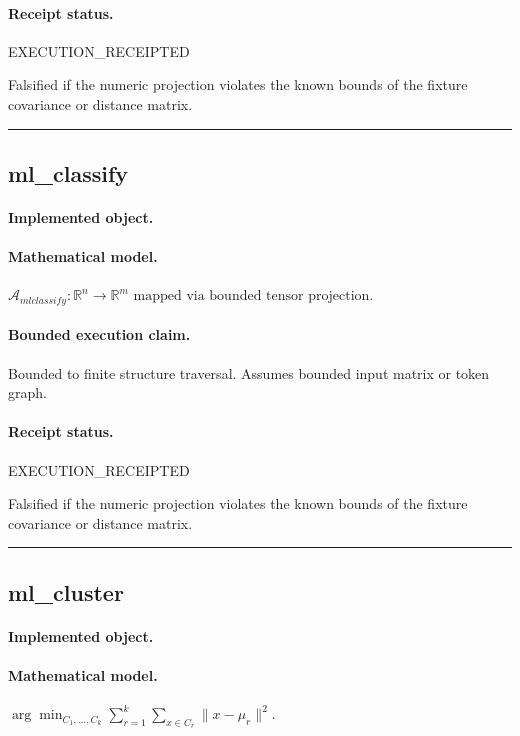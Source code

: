 \paragraph{Receipt status.} EXECUTION\_RECEIPTED
\begin{falsifier}
Falsified if the numeric projection violates the known bounds of the fixture covariance or distance matrix.
\end{falsifier}

\vspace{1em}\hrule\vspace{1em}
\subsection{ml\_classify}
\paragraph{Implemented object.} 
\paragraph{Mathematical model.} $\mathcal{A}_{mlclassify} : \mathbb{R}^{n} \to \mathbb{R}^{m} \text{ mapped via bounded tensor projection}.$
\paragraph{Bounded execution claim.} Bounded to finite structure traversal. Assumes bounded input matrix or token graph.
\paragraph{Receipt status.} EXECUTION\_RECEIPTED
\begin{falsifier}
Falsified if the numeric projection violates the known bounds of the fixture covariance or distance matrix.
\end{falsifier}

\vspace{1em}\hrule\vspace{1em}
\subsection{ml\_cluster}
\paragraph{Implemented object.} 
\paragraph{Mathematical model.} $\arg\min_{C_1,\ldots,C_k} \sum_{r=1}^{k}\sum_{x\in C_r}\|x-\mu_r\|^2.$
